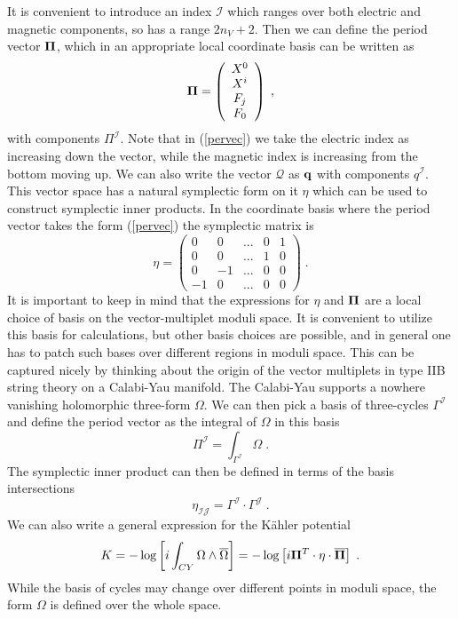 \documentclass[11pt,a4paper]{article}
\numberwithin{equation}{section}
\numberwithin{table}{section}\setlength{\multlinegap}{25pt}
\newcommand{\cI}{\mathcal{I}}
\newcommand{\cJ}{\mathcal{J}}
\newcommand{\cQ}{\mathcal Q}
\newcommand{\be}{\begin{equation}}
\newcommand{\ee}{\end{equation}}
\begin{document}
It is convenient to introduce an index $\cI$ which ranges over both electric and magnetic components, so has a range $2 n_V +2$. Then we can define the period vector ${\bf \Pi}$, which in an appropriate local coordinate basis can be written as
\be
{\bf \Pi} = \left( \begin{array}{c} X^0 \\ X^i \\ F_j \\ F_0  \end{array} \right)\;,
\label{pervec}
\ee
with components $\Pi^{\cI}$. Note that in (\ref{pervec}) we take the electric index as increasing down the vector, while the magnetic index is increasing from the bottom moving up. We can also write the vector $\cQ$ as ${\bf q}$ with components $q^{\cI}$. This vector space has a natural symplectic form on it $\eta$ which can be used to construct symplectic inner products. In the coordinate basis where the period vector takes the form (\ref{pervec}) the symplectic matrix is
\be
\eta = \left( \begin{array}{ccccc} 0 & 0 &... & 0 & 1 \\ 0 & 0 & ... &1 & 0  \\ 0 & -1&... &  0 & 0  \\ -1 & 0 &... & 0 & 0  \end{array} \right) \;.
\ee
It is important to keep in mind that the expressions for $\eta$ and ${\bf \Pi}$ are a local choice of basis on the vector-multiplet moduli space. It is convenient to utilize this basis for calculations, but other basis choices are possible, and in general one has to patch such bases over different regions in moduli space. This can be captured nicely by thinking about the origin of the vector multiplets in type IIB string theory on a Calabi-Yau manifold. The Calabi-Yau supports a nowhere vanishing holomorphic three-form $\Omega$. We can then pick a basis of three-cycles $\Gamma^{\cI}$ and define the period vector as the integral of $\Omega$ in this basis
\be
\Pi^{\cI} = \int_{\Gamma^{\cI}} \Omega \;.
\ee
The symplectic inner product can then be defined in terms of the basis intersections
\be
\eta_{\cI \cJ} = \Gamma^{\cI} \cdot \Gamma^{\cJ} \;.
\ee
We can also write a general expression for the K{\"a}hler potential
\be
K = - \log \left[i\int_{CY} \Omega \wedge \overline{\Omega} \right] = - \log \left[ i {\bf \Pi}^T \cdot \eta \cdot \overline{{\bf \Pi}} \right] \;.
\label{genKexpPi}
\ee
While the basis of cycles may change over different points in moduli space, the form $\Omega$ is defined over the whole space.
\end{document}
